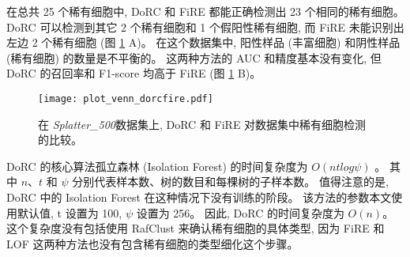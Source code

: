 在总共 25 个稀有细胞中, DoRC 和 FiRE 都能正确检测出 23 个相同的稀有细胞。
DoRC 可以检测到其它 2 个稀有细胞和 1 个假阳性稀有细胞,
而 FiRE 未能识别出左边 2 个稀有细胞 (图 \ref{fig:simulate:venn_auc_f1} A)。
在这个数据集中, 阳性样品 (丰富细胞) 和阴性样品 (稀有细胞) 的数量是不平衡的。
这两种方法的 AUC 和精度基本没有变化,
但 DoRC 的召回率和 F1-score 均高于 FiRE (图 \ref{fig:simulate:venn_auc_f1} B)。
\begin{figure}[!htbp]
    \centering
    \texttt{[image: plot\_venn\_dorcfire.pdf]}
    \caption{
    在 \textit{Splatter\_500}数据集上, DoRC 和 FiRE 对数据集中稀有细胞检测的比较。
    }
    \label{fig:simulate:venn_auc_f1}
\end{figure}

DoRC 的核心算法孤立森林 (Isolation Forest) 的时间复杂度为 $O(ntlog\psi)$ 。
其中 $n$、$t$ 和 $\psi$ 分别代表样本数、树的数目和每棵树的子样本数。
值得注意的是, DoRC 中的 Isolation Forest 在这种情况下没有训练的阶段。
该方法的参数本文使用默认值, t 设置为 100, $\psi$ 设置为 256。
因此, DoRC 的时间复杂度为 $O(n)$。
这个复杂度没有包括使用 RafClust 来确认稀有细胞的具体类型,
因为 FiRE 和 LOF 这两种方法也没有包含稀有细胞的类型细化这个步骤。

